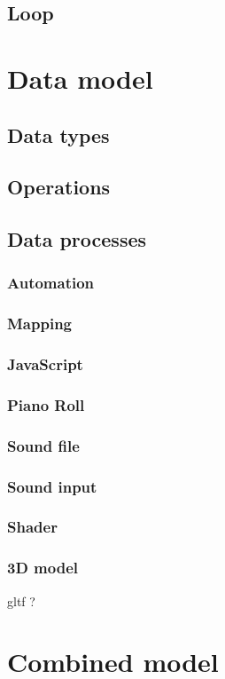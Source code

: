 \documentclass[a4paper]{article}
\begin{document}
\subsection{Loop}

\section{Data model}
\subsection{Data types}
\subsection{Operations}
\subsection{Data processes}
\subsubsection{Automation}
\subsubsection{Mapping}
\subsubsection{JavaScript}
\subsubsection{Piano Roll}
\subsubsection{Sound file}
\subsubsection{Sound input}

\subsubsection{Shader}
\subsubsection{3D model}
gltf ? 

\section{Combined model}
\end{document}
